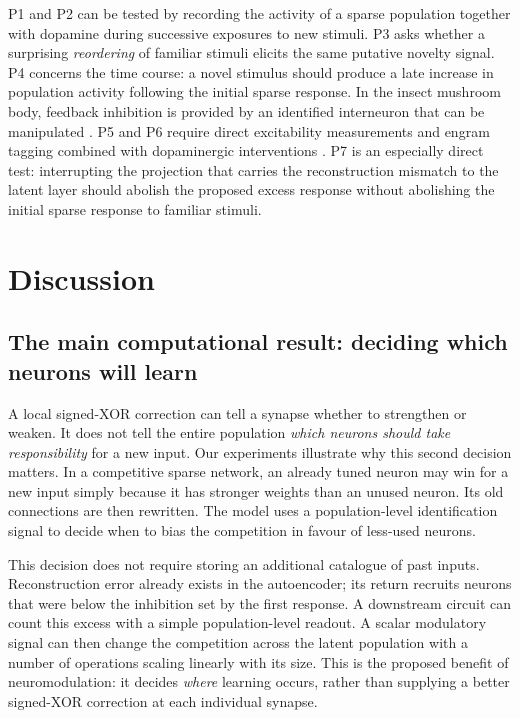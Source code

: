 \documentclass[11pt,a4paper]{article}
\begin{document}
P1 and P2 can be tested by recording the activity of a sparse population together with dopamine during successive exposures to new stimuli. P3 asks whether a surprising \emph{reordering} of familiar stimuli elicits the same putative novelty signal. P4 concerns the time course: a novel stimulus should produce a late increase in population activity following the initial sparse response. In the insect mushroom body, feedback inhibition is provided by an identified interneuron that can be manipulated \citep{lin2014}. P5 and P6 require direct excitability measurements and engram tagging combined with dopaminergic interventions \citep{josselyn2018,yiu2014}. P7 is an especially direct test: interrupting the projection that carries the reconstruction mismatch to the latent layer should abolish the proposed excess response without abolishing the initial sparse response to familiar stimuli.

\section{Discussion}\label{sec:discussion}

\subsection{The main computational result: deciding which neurons will learn}
A local signed-XOR correction can tell a synapse whether to strengthen or weaken. It does not tell the entire population \emph{which neurons should take responsibility} for a new input. Our experiments illustrate why this second decision matters. In a competitive sparse network, an already tuned neuron may win for a new input simply because it has stronger weights than an unused neuron. Its old connections are then rewritten. The model uses a population-level identification signal to decide when to bias the competition in favour of less-used neurons.

This decision does not require storing an additional catalogue of past inputs. Reconstruction error already exists in the autoencoder; its return recruits neurons that were below the inhibition set by the first response. A downstream circuit can count this excess with a simple population-level readout. A scalar modulatory signal can then change the competition across the latent population with a number of operations scaling linearly with its size. This is the proposed benefit of neuromodulation: it decides \emph{where} learning occurs, rather than supplying a better signed-XOR correction at each individual synapse.
\end{document}
